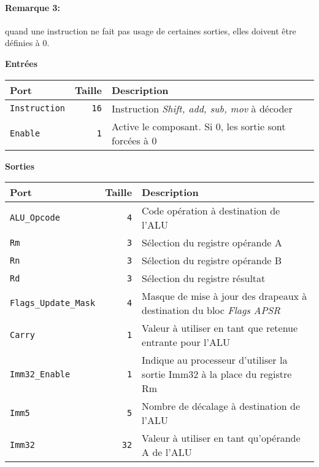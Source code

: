 \paragraph{Remarque 3:} quand une instruction ne fait pas usage de certaines sorties, elles doivent être définies à 0.



\textbf{Entrées}\\

\begin{tabular}{|l|r|l|}
\hline
\textbf{Port}		& \textbf{Taille} & \textbf{Description}\\
\hline

\texttt{Instruction}	& \texttt{16} & Instruction \textit{Shift, add, sub, mov} à décoder\\
\hline
\texttt{Enable}		&  \texttt{1} & Active le composant. Si 0, les sortie sont forcées à 0\\


\hline
\end{tabular}

\vspace{1em}
\textbf{Sorties}\\

\begin{tabular}{|l|r|l|}
\hline 
\textbf{Port} & \textbf{Taille} & \textbf{Description}\\
\hline

\texttt{ALU\_Opcode}		&  \texttt{4} & Code opération à destination de l'ALU\\
\hline
\texttt{Rm}			&  \texttt{3} & Sélection du registre opérande A\\
\hline
\texttt{Rn}			&  \texttt{3} & Sélection du registre opérande B\\
\hline
\texttt{Rd}			&  \texttt{3} & Sélection du registre résultat\\
\hline
\texttt{Flags\_Update\_Mask}	&  \texttt{4} & Masque de mise à jour des drapeaux à destination du bloc \textit{Flags APSR}\\
\hline
\texttt{Carry}			&  \texttt{1} & Valeur à utiliser en tant que retenue entrante pour l'ALU\\
\hline
\texttt{Imm32\_Enable}		&  \texttt{1} & Indique au processeur d'utiliser la sortie Imm32 à la place du registre Rm\\
\hline
\texttt{Imm5}			&  \texttt{5} & Nombre de décalage à destination de l'ALU\\
\hline
\texttt{Imm32}			& \texttt{32} & Valeur à utiliser en tant qu'opérande A de l'ALU\\

\hline
\end{tabular}








